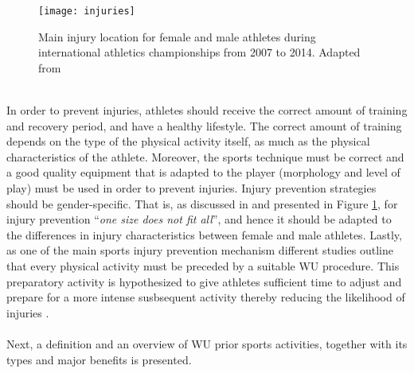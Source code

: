 \begin{figure}[h]
    \centering
    \texttt{[image: injuries]}
    \caption{Main injury location for female and male athletes during
international athletics championships from 2007 to 2014. Adapted from \cite{mayr2015prevention}}
    \label{fig:injuries}
\end{figure}\\
In order to prevent injuries, athletes should receive the correct amount of training and recovery period, and have a healthy lifestyle. The correct amount of training depends on the type of the physical activity itself, as much as the physical characteristics of the athlete. Moreover, the sports technique must be correct and a good quality equipment that is adapted to the player (morphology and level of play) must be used in order to prevent injuries. Injury prevention strategies should be gender-specific. That is, as discussed in \cite{edouard2015sex} and presented in Figure \ref{fig:injuries}, for injury prevention ``\textit{one size does not fit all}'', and hence it should be adapted to the differences in injury characteristics between female and male athletes. Lastly, as one of the main sports injury prevention mechanism different studies outline that every physical activity must be preceded by a suitable WU procedure. This preparatory activity is hypothesized to give athletes sufficient time to adjust and prepare for a more intense susbsequent activity thereby reducing the likelihood of injuries \cite{mayr2015prevention}.\\\\ Next, a definition and an overview of WU prior sports activities, together with its types and major benefits is presented.\pagebreak %
